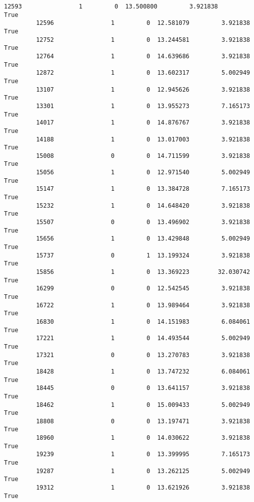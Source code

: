 \documentclass[11pt]{article}
\begin{document}
\begin{Verbatim}[commandchars=\\\{\}]
         12593                1         0  13.500800         3.921838        True  
         12596                1         0  12.581079         3.921838        True  
         12752                1         0  13.244581         3.921838        True  
         12764                1         0  14.639686         3.921838        True  
         12872                1         0  13.602317         5.002949        True  
         13107                1         0  12.945626         3.921838        True  
         13301                1         0  13.955273         7.165173        True  
         14017                1         0  14.876767         3.921838        True  
         14188                1         0  13.017003         3.921838        True  
         15008                0         0  14.711599         3.921838        True  
         15056                1         0  12.971540         5.002949        True  
         15147                1         0  13.384728         7.165173        True  
         15232                1         0  14.648420         3.921838        True  
         15507                0         0  13.496902         3.921838        True  
         15656                1         0  13.429848         5.002949        True  
         15737                0         1  13.199324         3.921838        True  
         15856                1         0  13.369223        32.030742        True  
         16299                0         0  12.542545         3.921838        True  
         16722                1         0  13.989464         3.921838        True  
         16830                1         0  14.151983         6.084061        True  
         17221                1         0  14.493544         5.002949        True  
         17321                0         0  13.270783         3.921838        True  
         18428                1         0  13.747232         6.084061        True  
         18445                0         0  13.641157         3.921838        True  
         18462                1         0  15.009433         5.002949        True  
         18808                0         0  13.197471         3.921838        True  
         18960                1         0  14.030622         3.921838        True  
         19239                1         0  13.399995         7.165173        True  
         19287                1         0  13.262125         5.002949        True  
         19312                1         0  13.621926         3.921838        True  
\end{Verbatim}
            
\end{document}
